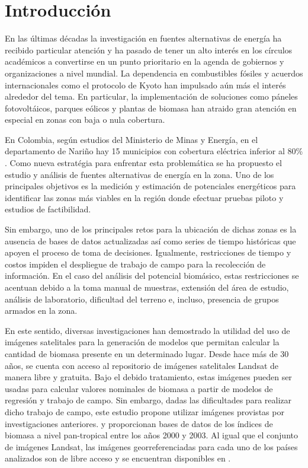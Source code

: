 \section{Introducción}

\IEEEPARstart 
En las últimas décadas la investigación en fuentes alternativas de energía ha recibido particular atención y ha pasado de tener un alto interés en los círculos académicos a convertirse en un punto prioritario en la agenda de gobiernos y organizaciones a nivel mundial.  La dependencia en combustibles fósiles y acuerdos internacionales como el protocolo de Kyoto han impulsado aún más el interés alrededor del tema.  En particular, la implementación de soluciones como páneles fotovoltáicos, parques eólicos y plantas de biomasa han atraido gran atención en especial en zonas con baja o nula cobertura.

En Colombia, según estudios del Ministerio de Minas y Energía, en el departamento de Nariño hay 15 municipios con cobertura eléctrica inferior al 80\% \cite{ministerio_de_minas_y_energia_plan_2008}. Como nueva estratégia para enfrentar esta problemática se ha propuesto el estudio y análisis de fuentes alternativas de energía en la zona. Uno de los principales objetivos es la medición y estimación de potenciales energéticos para identificar las zonas más viables en la región donde efectuar pruebas piloto y estudios de factibilidad. 

Sin embargo, uno de los principales retos para la ubicación de dichas zonas es la ausencia de bases de datos actualizadas así como series de tiempo históricas que apoyen el proceso de toma de decisiones.  Igualmente, restricciones de tiempo y costos impiden el despliegue de trabajo de campo para la recolección de información.  En el caso del análisis del potencial biomásico, estas restricciones se acentuan debido a la toma manual de muestras, extensión del área de estudio, análisis de laboratorio, dificultad del terreno e, incluso, presencia de grupos armados en la zona. 

En este sentido, diversas investigaciones han demostrado la utilidad del uso de imágenes satelitales para la generación de modelos que permitan calcular la cantidad de biomasa presente en un determinado lugar. Desde hace más de 30 años, se cuenta con acceso al repositorio de imágenes satelitales Landsat \cite{landsat} de manera libre y gratuita.  Bajo el debido tratamiento, estas imágenes pueden ser usadas para calcular valores nominales de biomasa a partir de modelos de regresión y trabajo de campo.  Sin embargo, dadas las dificultades para realizar dicho trabajo de campo, este estudio propone utilizar imágenes provistas por investigaciones anteriores.   \cite{baccini2008afirst} y \cite{baccini_estimated_2012} proporcionan bases de datos de los índices de biomasa a nivel pan-tropical entre los años 2000 y 2003.  Al igual que el conjunto de imágenes Landsat, las imágenes georreferenciadas para cada uno de los países analizados son de libre acceso y se encuentran disponibles en \cite{WHRC}.


